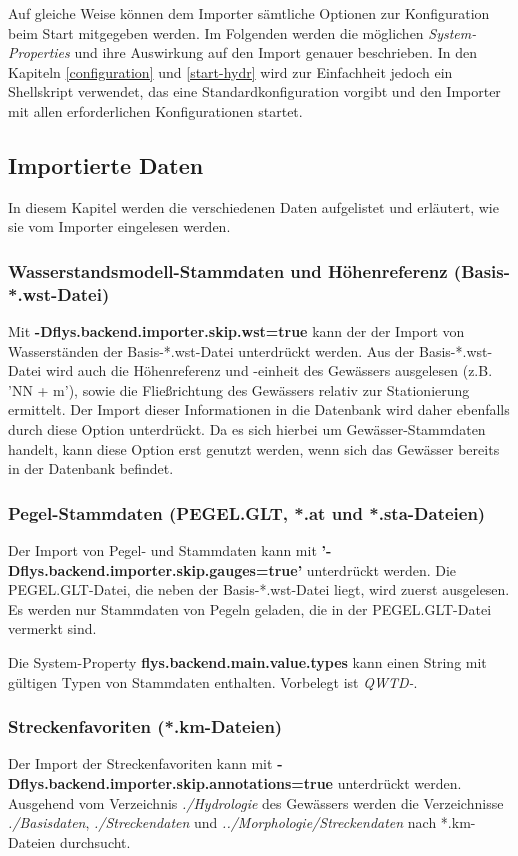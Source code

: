 Auf gleiche Weise können dem Importer sämtliche Optionen zur Konfiguration
beim Start mitgegeben werden. Im Folgenden werden die möglichen \textit{System-Properties} und
ihre Auswirkung auf den Import genauer beschrieben. In den Kapiteln
\ref{configuration} und \ref{start-hydr} wird zur Einfachheit jedoch ein
Shellskript verwendet, das eine Standardkonfiguration vorgibt und den Importer
mit allen erforderlichen Konfigurationen startet.


\subsection{Importierte Daten}
\label{import_data}
In diesem Kapitel werden die verschiedenen Daten aufgelistet und erläutert, wie sie vom
Importer eingelesen werden.

\subsubsection{Wasserstandsmodell-Stammdaten und Höhenreferenz (Basis-*.wst-Datei)}
Mit \textbf{-Dflys.backend.importer.skip.wst=true} kann der
der Import von Wasserständen der Basis-*.wst-Datei unterdrückt werden.
Aus der Basis-*.wst-Datei wird auch die Höhenreferenz und -einheit
des Gewässers ausgelesen (z.B. 'NN + m'),
sowie die Fließrichtung des Gewässers relativ zur Stationierung ermittelt.
Der Import dieser Informationen in die Datenbank wird daher ebenfalls durch
diese Option unterdrückt.
Da es sich hierbei um Gewässer-Stammdaten handelt,
kann diese Option erst genutzt werden, wenn sich das Gewässer bereits
in der Datenbank befindet.

\subsubsection{Pegel-Stammdaten (PEGEL.GLT, *.at und *.sta-Dateien)}
Der Import von Pegel- und Stammdaten kann mit \textbf{'-Dflys.backend.importer.skip.gauges=true'}
unterdrückt werden. Die PEGEL.GLT-Datei, die neben der Basis-*.wst-Datei liegt, wird zuerst
ausgelesen. Es werden nur Stammdaten von Pegeln geladen, die in der PEGEL.GLT-Datei
vermerkt sind.

Die System-Property \textbf{flys.backend.main.value.types} kann einen String
mit gültigen Typen von Stammdaten enthalten. Vorbelegt ist \textit{QWTD-}.

\subsubsection{Streckenfavoriten (*.km-Dateien)}
Der Import der Streckenfavoriten kann mit \textbf{-Dflys.backend.importer.skip.annotations=true}
unterdrückt werden.
Ausgehend vom Verzeichnis \textit{./Hydrologie} des Gewässers
werden die Verzeichnisse \textit{./Basisdaten}, \textit{./Streckendaten}
und \textit{../Morphologie/Streckendaten} nach *.km-Dateien durchsucht.


